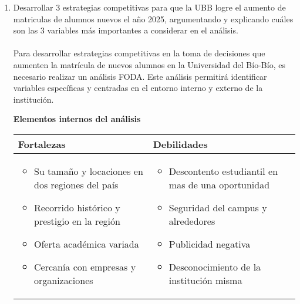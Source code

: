 \documentclass{templateNote}
\begin{document}

\portada
\margenes

\begin{enumerate}
    \item Desarrollar 3 estrategias competitivas para que la UBB logre el aumento de matriculas de alumnos nuevos el año 2025, argumentando y explicando cuáles son las 3 variables más importantes a considerar en el análisis. \\\\
    \noindent Para desarrollar estrategias competitivas en la toma de decisiones que aumenten la matrícula de nuevos alumnos en la Universidad del Bío-Bío, es necesario realizar un análisis FODA. Este análisis permitirá identificar variables específicas y centradas en el entorno interno y externo de la institución.\\
    \begin{center}
        \textbf{Elementos internos del análisis} \\
        \vspace{0.5cm} %
        \begin{tabularx}{\textwidth}{|X|X|}
            \hline
            \textbf{Fortalezas} & \textbf{Debilidades} \\
            \hline
            \begin{itemize}[leftmargin=*]
                \item Su tamaño y locaciones en dos regiones del país
                \item Recorrido histórico y prestigio en la región
                \item Oferta académica variada
                \item Cercanía con empresas y organizaciones
            \end{itemize} 
            & 
            \begin{itemize}
                \item Descontento estudiantil en mas de una oportunidad
                \item Seguridad del campus y alrededores
                \item Publicidad negativa
                \item Desconocimiento de la institución misma
            \end{itemize}
            \\
            \hline
        \end{tabularx}   


\end{center}
\end{enumerate}
\end{document}
